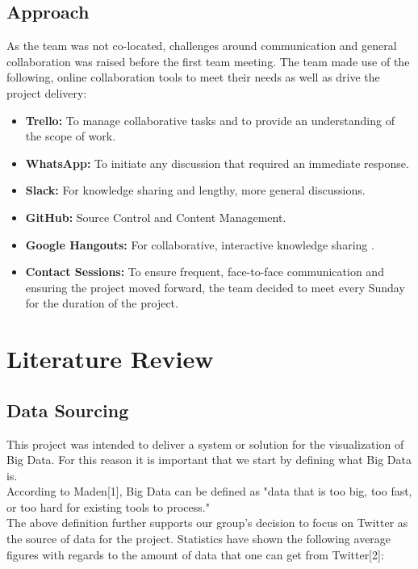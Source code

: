 \documentclass[12pt]{article} %
\begin{document}
\subsection{Approach}

As the team was not co-located, challenges around communication and general collaboration was raised before the first team meeting. 
The team made use of the following, online collaboration tools to meet their needs as well as drive the project delivery:
\begin{itemize}
	\item \textbf{Trello:} To manage collaborative tasks and to provide an understanding of the scope of work.
	\item \textbf{WhatsApp:} To initiate any discussion that required an immediate response.
	\item \textbf{Slack:} For knowledge sharing and lengthy, more general discussions.
	\item \textbf{GitHub:} Source Control and Content Management.
	\item \textbf{Google Hangouts:} For collaborative, interactive knowledge sharing .
	\item \textbf{Contact Sessions:} To ensure frequent, face-to-face communication and ensuring the project moved forward, the team decided to meet every Sunday for the duration of the project. 
\end{itemize}

	
		
		
	\section{Literature Review}
	
	\subsection {Data Sourcing}
	
	This project was intended to deliver a system or solution for the visualization of Big Data. For this reason it is important that we start by defining what Big Data is.
	\\
	According to Maden[1], Big Data can be defined as "data that is too big, too fast, or too hard for existing tools to process."
	\\
	The above definition further supports our group's decision to focus on Twitter as the source of data for the project. Statistics have shown the following average figures with regards to the amount of data that one can get from Twitter[2]:
	\\
	
\end{document}
